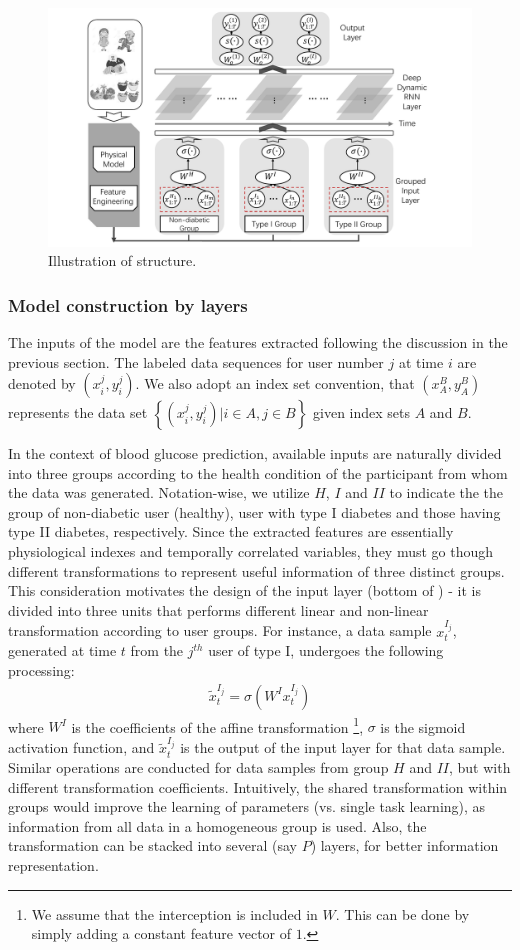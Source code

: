 \begin{figure}[h]
  \centering
  \includegraphics[width=0.75\columnwidth]{./img/pics_RNN3.pdf}
  \caption{Illustration of \modelname structure.}
  \label{fig:rnn}
\end{figure}

\subsubsection{Model construction by layers}
The inputs of the \modelname model are the features extracted following the discussion in the previous section.
The labeled data sequences for user number $j$ at time $i$ are denoted by $(x_i^{j},y_i^{j})$.
We also adopt an index set convention, that $(x_A^{B},y_A^B)$ represents the data set $\left\{(x_i^{j},y_i^{j}) | i \in A, j\in B\right\}$ given index sets $A$ and $B$.

In the context of blood glucose prediction, available inputs are naturally divided into three groups according to the health condition of the participant from whom the data was generated.
Notation-wise, we utilize $H$, $I$ and $II$ to indicate the the group of non-diabetic user (healthy), user with type I diabetes and those having type II diabetes, respectively.
Since the extracted features are essentially physiological indexes and temporally correlated variables, they must go though different transformations to represent useful information of three distinct groups.
This consideration motivates the design of the input layer (bottom of ) - it is divided into three units that performs different linear and non-linear transformation according to user groups.
For instance, a data sample $x_t^{I_j}$, generated at time $t$ from the $j^{th}$ user of type I, undergoes the following processing:
\begin{align}
\tilde{x}_t^{I_j} = \sigma \left( W^Ix_t^{I_j} \right)
\end{align}
where $W^I$ is the coefficients of the affine transformation \footnote{We assume that the interception is included in $W$. This can be done by simply adding a constant feature vector of $1$.}, $\sigma$ is the sigmoid activation function, and $\tilde{x}_t^{I_j}$ is the output of the input layer for that data sample.
Similar operations are conducted for data samples from group $H$ and $II$, but with different transformation coefficients.
Intuitively, the shared transformation within groups would improve the learning of parameters (vs. single task learning), as information from all data in a homogeneous group is used.
Also, the transformation can be stacked into several (say $P$) layers, for better information representation.

